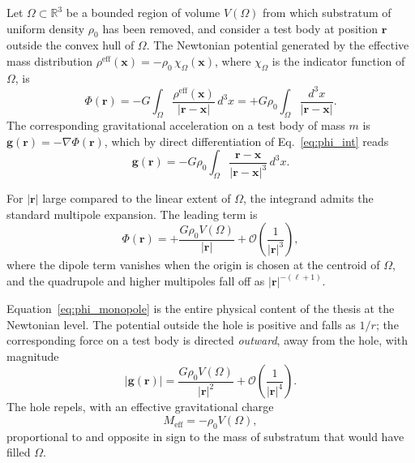 \documentclass[%
  reprint,
  superscriptaddress,
  showpacs,
  showkeys,
  amsmath,amssymb,
  pra,
  longbibliography,
  floatfix,
  x11names
]{revtex4-2}
\begin{document}
Let $\Omega \subset \mathbb{R}^3$ be a bounded region of volume $V(\Omega)$ from which substratum of uniform density $\rho_0$ has been removed, and consider a test body at position $\mathbf{r}$ outside the convex hull of $\Omega$. The Newtonian potential generated by the effective mass distribution $\rho^{\mathrm{eff}}(\mathbf{x}) = -\rho_0\, \chi_\Omega(\mathbf{x})$, where $\chi_\Omega$ is the indicator function of $\Omega$, is
\begin{equation}
\Phi(\mathbf{r}) = -G \int_\Omega \frac{\rho^{\mathrm{eff}}(\mathbf{x})}{|\mathbf{r} - \mathbf{x}|}\, d^3x = +G\rho_0 \int_\Omega \frac{d^3x}{|\mathbf{r} - \mathbf{x}|}.
\label{eq:phi_int}
\end{equation}
The corresponding gravitational acceleration on a test body of mass $m$ is $\mathbf{g}(\mathbf{r}) = -\nabla \Phi(\mathbf{r})$, which by direct differentiation of Eq.~\eqref{eq:phi_int} reads
\begin{equation}
\mathbf{g}(\mathbf{r}) = -G\rho_0 \int_\Omega \frac{\mathbf{r} - \mathbf{x}}{|\mathbf{r} - \mathbf{x}|^3}\, d^3x.
\label{eq:g_int}
\end{equation}

For $|\mathbf{r}|$ large compared to the linear extent of $\Omega$, the integrand admits the standard multipole expansion. The leading term is
\begin{equation}
\Phi(\mathbf{r}) = +\frac{G \rho_0 V(\Omega)}{|\mathbf{r}|} + \mathcal{O}\!\left(\frac{1}{|\mathbf{r}|^3}\right),
\label{eq:phi_monopole}
\end{equation}
where the dipole term vanishes when the origin is chosen at the centroid of $\Omega$, and the quadrupole and higher multipoles fall off as $|\mathbf{r}|^{-(\ell+1)}$.

Equation~\eqref{eq:phi_monopole} is the entire physical content of the thesis at the Newtonian level. The potential outside the hole is positive and falls as $1/r$; the corresponding force on a test body is directed \emph{outward}, away from the hole, with magnitude
\begin{equation}
|\mathbf{g}(\mathbf{r})| = \frac{G \rho_0 V(\Omega)}{|\mathbf{r}|^2} + \mathcal{O}\!\left(\frac{1}{|\mathbf{r}|^4}\right).
\label{eq:g_monopole}
\end{equation}
The hole repels, with an effective gravitational charge
\begin{equation}
M_{\mathrm{eff}} = -\rho_0 V(\Omega),
\label{eq:Meff_volume}
\end{equation}
proportional to and opposite in sign to the mass of substratum that would have filled $\Omega$.
\end{document}
